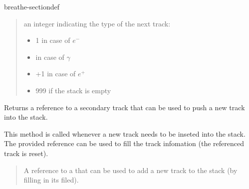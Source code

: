 \documentclass[letterpaper,10pt,english]{sphinxmanual}
\begin{document}
\begin{fulllineitems}
\begin{sphinxuseclass}{breathe-sectiondef}
\begin{fulllineitems}
\sphinxAtStartPar
\begin{quote}\begin{description}
\sphinxAtStartPar
an integer indicating the type of the next track:\begin{itemize}
\item {} 
\sphinxAtStartPar
\sphinxhyphen{}1 in case of \(e^-\)

\item {} 
 in case of \(\gamma\)

\item {} 
\sphinxAtStartPar
+1 in case of \(e^+\)

\item {} 
\sphinxAtStartPar
\sphinxhyphen{}999 if the stack is empty 

\end{itemize}


\end{description}\end{quote}


\end{fulllineitems}


\begin{fulllineitems}
\label{\detokenize{Simulation/SimulationCodeDoc:_CPPv4N10TrackStack6InsertEv}}
\pysigstartsignatures
\pysigstartmultiline
{}
\pysigstopmultiline
\pysigstopsignatures
\sphinxAtStartPar
Returns a reference to a secondary track that can be used to push a new track into the stack. 

\sphinxAtStartPar
This method is called whenever a new track needs to be inseted into the stack. The provided reference can be used to fill the track infomation (the referenced track is re\sphinxhyphen{}set).

\sphinxAtStartPar
\begin{quote}\begin{description}
\sphinxAtStartPar
A reference to a  that can be used to add a new track to the stack (by filling in its filed). 

\end{description}\end{quote}



\end{fulllineitems}
\end{sphinxuseclass}
\end{fulllineitems}
\end{document}
